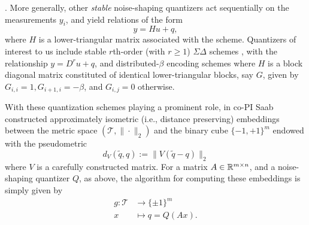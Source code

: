 . More generally, other \emph{stable} noise-shaping quantizers act sequentially on the measurements $y_i$, %
and yield relations of the form 
$$ y=Hu + q,$$ where $H$ is a lower-triangular matrix associated with the scheme. Quantizers of interest to us include
stable $r$th-order (with $r\geq 1$) $\Sigma\Delta$ schemes  \cite{}, with the relationship $y=D^r u+q$, and distributed-$\beta$ encoding schemes \cite{} where $H$ is a block diagonal matrix constituted of identical lower-triangular blocks, say $G$, given by $G_{i,i}=1, G_{i+1,i}=-\beta$, and $G_{i,j}=0$ otherwise.

With these quantization schemes playing a prominent role, in  \cite{huynh2018fast} co-PI Saab  constructed approximately isometric (i.e., distance preserving) embeddings between the metric space  $(\mathcal{T}, \|\cdot\|_2)$ and the binary  cube $\{-1,+1\}^m$ endowed with the pseudometric
$$d_{{V}}(\tilde{q},q) := \| {V}(\tilde{q} -{q}) \|_2$$
where $V$ is a carefully constructed matrix.
For a  matrix $A\in\mathbb{R}^{m\times n}$, and a noise-shaping quantizer $Q$, as above, the algorithm for computing these embeddings is simply given by \begin{align}
g: \mathcal{T} &\to \{\pm 1\}^m\nonumber\\
x &\mapsto q=Q(Ax).\nonumber
\end{align}

